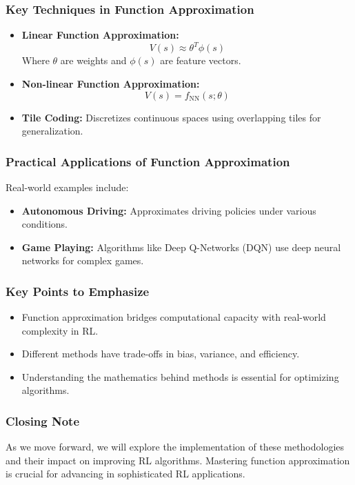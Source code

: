 \documentclass[aspectratio=169]{beamer}
\begin{document}
\begin{frame}[fragile]
    \frametitle{Key Techniques in Function Approximation}
    \begin{itemize}
        \item \textbf{Linear Function Approximation:}
        \begin{equation}
            V(s) \approx \theta^T \phi(s)
        \end{equation}
        Where \( \theta \) are weights and \( \phi(s) \) are feature vectors.
        
        \item \textbf{Non-linear Function Approximation:} 
        \begin{equation}
            V(s) = f_{\text{NN}}(s; \theta)
        \end{equation}
        
        \item \textbf{Tile Coding:} Discretizes continuous spaces using overlapping tiles for generalization.
    \end{itemize}
\end{frame}

\begin{frame}[fragile]
    \frametitle{Practical Applications of Function Approximation}
    Real-world examples include:
    \begin{itemize}
        \item \textbf{Autonomous Driving:} Approximates driving policies under various conditions.
        \item \textbf{Game Playing:} Algorithms like Deep Q-Networks (DQN) use deep neural networks for complex games.
    \end{itemize}
\end{frame}

\begin{frame}[fragile]
    \frametitle{Key Points to Emphasize}
    \begin{itemize}
        \item Function approximation bridges computational capacity with real-world complexity in RL.
        \item Different methods have trade-offs in bias, variance, and efficiency.
        \item Understanding the mathematics behind methods is essential for optimizing algorithms.
    \end{itemize}
\end{frame}

\begin{frame}[fragile]
    \frametitle{Closing Note}
    As we move forward, we will explore the implementation of these methodologies and their impact on improving RL algorithms. Mastering function approximation is crucial for advancing in sophisticated RL applications.
\end{frame}
\end{document}
